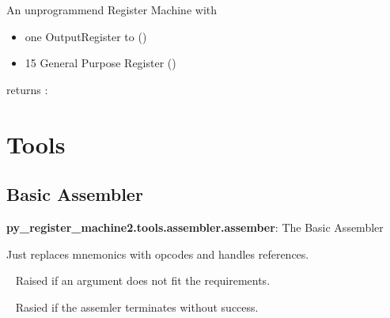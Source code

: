 \documentclass[letterpaper,10pt,english]{sphinxmanual}
\begin{document}
\begin{fulllineitems}
\label{machines:py_register_machine2.machines.small.small_register_machine}
An unprogrammend Register Machine with
\begin{itemize}
\item {} 
one OutputRegister to  ()

\item {} 
15 General Purpose Register ()

\end{itemize}

returns : 

\end{fulllineitems}



\chapter{Tools}
\label{tools::doc}\label{tools:tools}

\section{Basic Assembler}
\label{tools:module-py_register_machine2.tools.assembler.assembler}\label{tools:basic-assembler}
\textbf{py\_register\_machine2.tools.assembler.assember}: The Basic Assembler

Just replaces mnemonics with opcodes and handles references.

\begin{fulllineitems}
\label{tools:py_register_machine2.tools.assembler.assembler.ArgumentError}~\label{tools:argumenterror}
Raised if an argument does not fit the requirements.

\end{fulllineitems}


\begin{fulllineitems}
\label{tools:py_register_machine2.tools.assembler.assembler.AssembleError}~\label{tools:assembleerror}
Rasied if the assemler terminates without success.

\end{fulllineitems}
\end{document}
